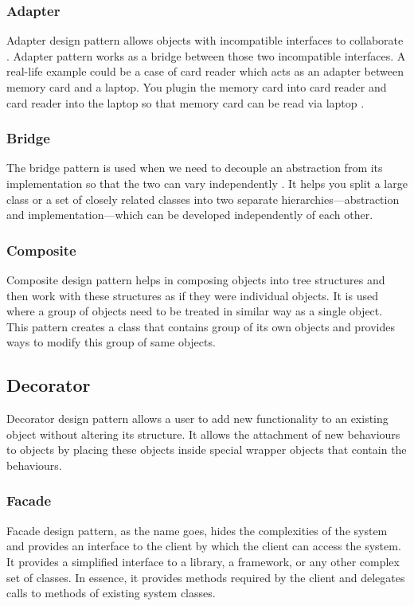 \documentclass[sigplan,12pt,nonacm=true,review=false]{acmart}
\begin{document}
\subsubsection{Adapter}
Adapter design pattern allows objects with incompatible interfaces to collaborate \cite{tichy_catalogue_1997}. Adapter pattern works as a bridge between those two incompatible interfaces. A real-life example could be a case of card reader which acts as an adapter between memory card and a laptop. You plugin the memory card into card reader and card reader into the laptop so that memory card can be read via laptop \cite{noauthor_design_nodate-5}.  

\subsubsection{Bridge}
The bridge pattern is used when we need to decouple \cite{wendorff_assessment_2001} an abstraction from its implementation so that the two can vary independently \cite{tichy_catalogue_1997}. It helps you split a large class or a set of closely related classes into two separate hierarchies—abstraction and implementation—which can be developed independently of each other. 

\subsubsection{Composite}
Composite design pattern helps in composing objects into tree structures and then work with these structures as if they were individual objects. It is used where a group of objects need to be treated in similar way as a single object. This pattern creates a class that contains group of its own objects and provides ways to modify this group of same objects. 

\subsection{Decorator}
Decorator design pattern allows a user to add new functionality to an existing object without altering its structure. It allows the attachment of new behaviours to objects by placing these objects inside special wrapper objects that contain the behaviours. 

\subsubsection{Facade}
Facade design pattern, as the name goes, hides the complexities of the system and provides an interface to the client by which the client can access the system. It provides a simplified interface to a library, a framework, or any other complex set of classes. In essence, it provides methods required by the client and delegates calls to methods of existing system classes. 
\end{document}
